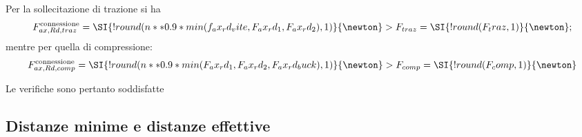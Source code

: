 \begin{pysub}[viti]
Per la sollecitazione di trazione si ha
\begin{equation}
    F_{ax,Rd,traz}^\textup{connessione} = \SI{!{round(n**0.9 * min(f_ax_rd_vite,F_ax_rd_1,F_ax_rd_2),1)}}{\newton} > F_{traz} = \SI{!{round(F_traz,1)}}{\newton} ;
\end{equation}
mentre per quella di compressione:
\begin{equation}
    F_{ax,Rd,comp}^\textup{connessione} = \SI{!{round(n**0.9 * min(F_ax_rd_1,F_ax_rd_2,F_ax_rd_buck),1)}}{\newton} > F_{comp} = \SI{!{round(F_comp,1)}}{\newton}
\end{equation}

Le verifiche sono pertanto soddisfatte
\subsection{Distanze minime e distanze effettive}

\end{pysub}
